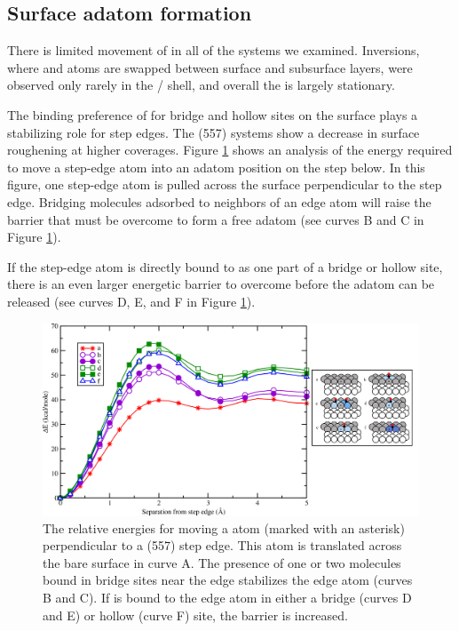\subsection{Surface adatom formation}
There is limited movement of  in all of the systems we
examined. Inversions, where  and  atoms are swapped
between surface and subsurface layers, were observed only rarely in
the / shell, and overall the  is largely
stationary.

The binding preference of  for bridge and hollow sites on the
 surface plays a stabilizing role for step edges.  The
(557) systems show a decrease in surface roughening at higher
 coverages. Figure \ref{fig:PdEnergy} shows an analysis of the
energy required to move a step-edge atom into an adatom position on
the step below. In this figure, one step-edge  atom is pulled
across the surface perpendicular to the step edge.  Bridging 
molecules adsorbed to neighbors of an edge atom will raise the barrier
that must be overcome to form a free adatom (see curves B and C in
Figure \ref{fig:PdEnergy}).

If the step-edge atom is directly bound to  as one part of a
bridge or hollow site, there is an even larger energetic barrier to
overcome before the adatom can be released (see curves D, E, and F in
Figure \ref{fig:PdEnergy}).

\begin{landscape}
\begin{figure}[p!]
  \includegraphics[width=0.9\linewidth]{../figures/chap3/PdEnergy_CO.pdf}
  \caption{The relative energies for moving a  atom (marked with an
asterisk) perpendicular to a (557) step edge. This atom is translated across
the bare  surface in curve A. The presence of one or two 
molecules bound in bridge sites near the edge stabilizes the edge atom (curves
B and C).  If  is bound to the edge atom in either a bridge (curves D
and E) or hollow (curve F) site, the barrier is increased.}
\label{fig:PdEnergy}
\end{figure}
\end{landscape}

